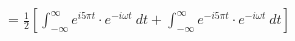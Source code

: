 \documentclass[preview]{standalone}
\begin{document}
\begin{align*}
&=\frac{1}{2}\left[ \int_{-\infty}^{\infty}e^{i5\pi t}\cdot e^{-i\omega t} \ dt+\int_{-\infty}^{\infty} e^{-i5\pi t}\cdot e^{-i\omega t} \ dt \right] \\
\end{align*}
\end{document}
